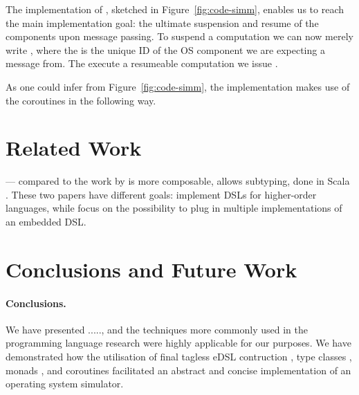 The implementation of , sketched in Figure~\ref{fig:code-simm}, enables us to reach the main implementation goal: the ultimate suspension and resume of the components upon message passing.
To suspend a computation we can now merely write , where the  is the unique ID of the OS component we are expecting a message from.
The execute a resumeable computation we issue .

As one could infer from Figure~\ref{fig:code-simm}, the implementation makes use of the coroutines in the following way. 


\section{Related Work}
\label{sec:related-work}


\cite{house}
\cite{final_tagless_embedding}

\cite{Hofer:2008:PED:1449913.1449935} --- compared to the work by
\citeauthor{final_tagless_embedding} \cite{final_tagless_embedding} is
more composable, allows subtyping, done in Scala
\cite{odersky2008programming}. These two papers have different goals:
\citeauthor{final_tagless_embedding} implement DSLs for higher-order languages, while \citeauthor{Hofer:2008:PED:1449913.1449935} focus on the possibility to plug in multiple implementations of an embedded DSL. 


\section{Conclusions and Future Work}
\label{sec:concl-future-work}

\paragraph{Conclusions.} 
We have presented ....., and the techniques more commonly used in the
programming language research were highly applicable for our purposes.
We have demonstrated how the utilisation of final tagless eDSL contruction \cite{...}, type classes \cite{...}, monads \cite{...}, and coroutines \cite{...} facilitated an abstract and concise implementation of an operating system simulator.

